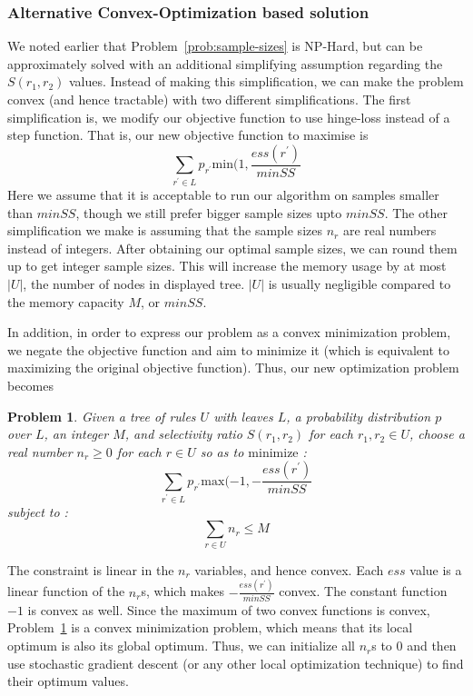 \documentclass[10pt,journal,compsoc]{IEEEtran}
\newcounter{prob}
\newtheorem{problem}[prob]{Problem}
\newcommand{\techreporttext}[1]{#1}
\begin{document}
\techreporttext{
\subsubsection{Alternative Convex-Optimization based solution}
We noted earlier that Problem~\ref{prob:sample-sizes} is NP-Hard, but can be approximately solved with an additional simplifying assumption regarding the $S(r_1, r_2)$ values. Instead of making this simplification, we can make the problem convex (and hence tractable) with two different simplifications. The first simplification is, we modify our objective function to use hinge-loss instead of a step function. That is, our new objective function to maximise is $$\sum_{r^{\prime} \in L} p_{r^{\prime}}\textrm{min}(1, \frac{ess(r^{\prime})}{minSS} $$
Here we assume that it is acceptable to run our algorithm on samples smaller than $minSS$,  though we still prefer bigger sample sizes upto $minSS$. The other simplification we make is assuming that the sample sizes $n_r$ are real numbers instead of integers. After obtaining our optimal sample sizes, we can round them up to get integer sample sizes. This will increase the memory usage by at most $|U|$, the number of nodes in displayed tree. $|U|$ is usually negligible compared to the memory capacity $M$, or $minSS$.

In addition, in order to express our problem as a convex minimization problem, we negate the objective function and aim to minimize it (which is equivalent to maximizing the original objective function). Thus, our new optimization problem becomes
\begin{problem}\label{prob:sample-sizes-hinge-loss}
Given a tree of rules $U$ with leaves $L$, a probability distribution $p$ over $L$, an integer $M$, and selectivity ratio $S(r_1, r_2)$ for each $r_1, r_2 \in U$, 
choose a real number $n_r \geq 0$ for each $r \in U$ so as to $\textrm{minimize}$ :
$$\sum_{r^{\prime} \in L} p_{r^{\prime}}\textrm{max}(-1, -\frac{ess(r^{\prime})}{minSS} $$
subject to :
$$\sum_{r \in U} n_r \leq M$$
\end{problem}
The constraint is linear in the $n_r$ variables, and hence convex. Each $ess$ value is a linear function of the $n_r$s, which makes $-\frac{ess(r^{\prime})}{minSS}$ convex. The constant function $-1$ is convex as well. Since the maximum of two convex functions is convex, Problem~\ref{prob:sample-sizes-hinge-loss} is a convex minimization problem, which means that its local optimum is also its global optimum. Thus, we can initialize all $n_r$s to $0$ and then use stochastic gradient descent (or any other local optimization technique) to find their optimum values. 

}
\end{document}
